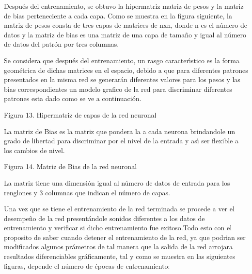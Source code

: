 Despu\'{e}s del entrenamiento, se obtuvo la hipermatriz matriz de pesos y la
matriz de bias perteneciente a cada capa. Como se muestra en la figura
siguiente, la matriz de pesos consta de tres capas de matrices de nxn, donde
n es el n\'{u}mero de datos y la matriz de bias es una matriz de una capa de
tama\~{n}o y igual al n\'{u}mero de datos del patr\'{o}n por tres columnas.

Se considera que despu\'{e}s del entrenamiento, un rasgo caracter\'{\i}stico
es la forma geom\'{e}trica de dichas matrices en el espacio, debido a que
para diferentes patrones presentados en la misma red se generar\'{a}n
diferentes valores para los pesos y las bias correspondientes un modelo
grafico de la red para discriminar diferentes patrones esta dado como se ve
a continuaci\'{o}n.

\begin{center}

Figura 13. Hipermatriz de capas de la red neuronal
\end{center}

\bigskip

La matriz de Bias es la matriz que pondera la a cada neurona brindandole un
grado de libertad para discriminar por el nivel de la entrada y as\'{\i} ser
flexible a los cambios de nivel.

\begin{center}

\qquad Figura 14. Matriz de Bias de la red neuronal
\end{center}

\bigskip

\textbf{\qquad }La matriz tiene una dimensi\'{o}n igual al n\'{u}mero de
datos de entrada para los renglones y 3 columnas que indican el n\'{u}mero
de capas.

Una vez que se tiene el entrenamiento de la red terminada se procede a ver
el desempe\~{n}o de la red present\'{a}ndole sonidos diferentes a los datos
de entrenamiento y verificar si dicho entrenamiento fue exitoso.Todo esto
con el proposito de saber cuando detener el entrenamiento de la red, ya que
podrian ser modificados algunos pr\'{a}metros de tal manera que la salida de
la red arrojara resultados diferenciables gr\'{a}ficamente, tal y como se
muestra en las siguientes figuras, depende el n\'{u}mero de \'{e}pocas de
entrenamiento:

